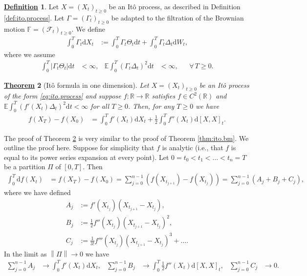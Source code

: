 \documentclass[12pt]{book}
\numberwithin{equation}{chapter}
\theoremstyle{plain}
\newtheorem{theorem}{\underline{Theorem}}
\numberwithin{theorem}{section}
\theoremstyle{definition}
\newtheorem{definition}[theorem]{\underline{Definition}}
\numberwithin{exercise}{chapter}
\let\oldendproof\endproof
\renewenvironment{proof}[1][\proofname]{%
  \oldproof[\scshape\underline{#1}]%
}{\oldendproof}
\newcommand{\<}{\langle}
\renewcommand{\>}{\rangle}
\renewcommand{\(}{\left(}
\renewcommand{\)}{\right)}
\renewcommand{\[}{\left[}
\renewcommand{\]}{\right]}
\newcommand\Eb{\mathds{E}}
\newcommand\Fb{\mathds{F}}
\newcommand\Rb{\mathds{R}}
\newcommand\Fc{\mathscr{F}}
\newcommand\Gam{\Gamma}
\newcommand\Del{\Delta}
\newcommand\dd{\mathrm{d}}
\newcommand{\norm}[1]{\left\|#1\right\|}
\begin{document}
\begin{definition}
Let $X = (X_t)_{t \geq 0}$ be an It\^o process, as described in Definition \ref{def:ito.process}.  Let $\Gam = (\Gam_t)_{t \geq 0}$ be adapted to the filtration of the Brownian motion $\Fb=(\Fc_t)_{t \geq 0}$.  We define 
\begin{align}
\int_0^T \Gam_t \dd X_t
	&:=	\int_0^T \Gam_t \Theta_t \dd t + \int_0^T \Gam_t \Del_t \dd W_t ,
\end{align}
where we assume
\begin{align}
\int_0^T | \Gam_t \Theta_t | \dd t 
	&< \infty , &
\Eb \int_0^T \( \Gam_t \Del_t \)^2 \dd t
	&< \infty , &
	& \forall \, T \geq 0 .
\end{align}
\end{definition}

\begin{theorem}[It\^o formula in one dimension]
\label{thm:ito.X}
Let $X = (X_t)_{t \geq 0}$ be an It\^o process of the form \eqref{eq:ito.process} and suppose $f : \Rb \to \Rb$ satisfies $f \in C^2(\Rb)$ and $\Eb \int_0^T ( f'(X_t) \Del_t )^2 \dd t < \infty$ for all $T \geq 0$.  Then, for any $T \geq 0$ we have
\begin{align}
f(X_T) - f(X_0)
	&=	\int_0^T f'(X_t) \dd X_t + \tfrac{1}{2} \int_0^T f''(X_t) \dd [X,X]_t . \label{eq:ito.X}
\end{align}
\end{theorem}

\begin{proof}
The proof of Theorem \ref{thm:ito.X} is very similar to the proof of Theorem \ref{thm:ito.bm}.  We outline the proof here.
Suppose for simplicity that $f$ is analytic (i.e., that $f$ is equal to its power series expansion at every point).  
Let $0 = t_0 < t_1 < \ldots < t_n = T$ be a partition $\Pi$ of $[0,T]$.
Then
\begin{align}
\int_0^T \dd f(X_t)
	&=	f(X_T) - f(X_0) 
	=		\sum_{j=0}^{n-1} \( f(X_{t_{j+1}}) - f(X_{t_j}) \) 
	=		\sum_{j=0}^{n-1} \( A_j + B_j + C_j \) ,
\end{align}
where we have defined
\begin{align}
A_j
	&:=	f'(X_{t_j}) \( X_{t_{j+1}} - X_{t_j} \) , \\
B_j
	&:=  \tfrac{1}{2} f''(X_{t_j}) \( X_{t_{j+1}} - X_{t_j} \)^2 , \\
C_j
	&:=	\tfrac{1}{3!} f'''(X_{t_j}) \( X_{t_{j+1}} - X_{t_j} \)^3 + \ldots .
\end{align}
In the limit as $\norm{\Pi} \to 0$ we have
\begin{align}
\sum_{j=0}^{n-1} A_j
	&\to \int_0^T f'(X_t) \dd X_t , &
\sum_{j=0}^{n-1} B_j
	&\to \int_0^T \tfrac{1}{2} f''(X_t) \dd [X,X]_t , &
\sum_{j=0}^{n-1} C_j
	&\to 0 .
\end{align}
\end{proof}
\end{document}

